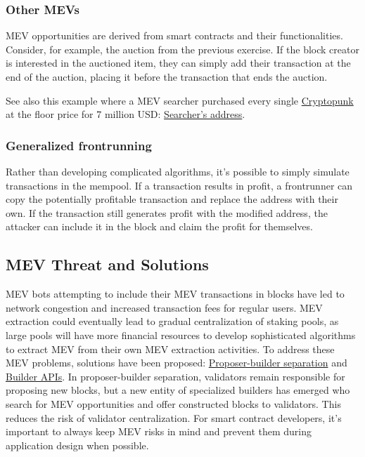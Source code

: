 \documentclass[12pt]{article}
\begin{document}
\subsubsection*{Other MEVs}
MEV opportunities are derived from smart contracts and their functionalities. Consider, for example, the auction from the previous exercise. If the block creator is interested in the auctioned item, they can simply add their transaction at the end of the auction, placing it before the transaction that ends the auction.

See also this example where a MEV searcher purchased every single \href{https://cryptopunks.app/}{Cryptopunk} at the floor price for 7 million USD: \href{https://etherscan.io/address/0x650dCdEB6ecF05aE3CAF30A70966E2F395d5E9E5}{Searcher's address}.

\subsubsection*{Generalized frontrunning}

Rather than developing complicated algorithms, it's possible to simply simulate transactions in the mempool. If a transaction results in profit, a frontrunner can copy the potentially profitable transaction and replace the address with their own. If the transaction still generates profit with the modified address, the attacker can include it in the block and claim the profit for themselves.

\subsection{MEV Threat and Solutions}

MEV bots attempting to include their MEV transactions in blocks have led to network congestion and increased transaction fees for regular users. MEV extraction could eventually lead to gradual centralization of staking pools, as large pools will have more financial resources to develop sophisticated algorithms to extract MEV from their own MEV extraction activities. To address these MEV problems, solutions have been proposed: \href{https://ethereum.org/en/developers/docs/mev/#proposer-builder-separation}{Proposer-builder separation} and \href{https://ethereum.org/en/developers/docs/mev/#builder-api}{Builder APIs}. In proposer-builder separation, validators remain responsible for proposing new blocks, but a new entity of specialized builders has emerged who search for MEV opportunities and offer constructed blocks to validators. This reduces the risk of validator centralization. For smart contract developers, it's important to always keep MEV risks in mind and prevent them during application design when possible.
\end{document}
